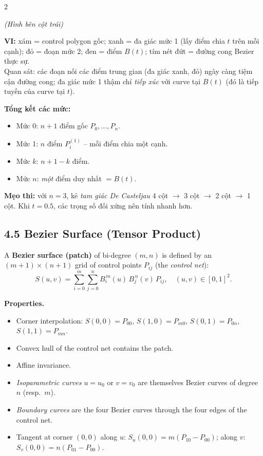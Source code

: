 \begin{paracol}{2}
\begin{center}
\textit{(Hình bên cột trái)}
\end{center}

\textbf{VI:} xám = control polygon gốc; xanh = đa giác mức 1 (lấy điểm chia $t$ trên mỗi cạnh); đỏ = đoạn mức 2; đen = điểm $B(t)$; tím nét đứt = đường cong Bezier thực sự.\\
Quan sát: các đoạn nối các điểm trung gian (đa giác xanh, đỏ) ngày càng tiệm cận đường cong; đa giác mức 1 thậm chí \emph{tiếp xúc} với curve tại $B(t)$ (đó là tiếp tuyến của curve tại $t$).

\medskip
\textbf{Tổng kết các mức:}
\begin{itemize}[leftmargin=*,nosep]
  \item Mức 0: $n{+}1$ điểm gốc $P_0,\dots,P_n$.
  \item Mức 1: $n$ điểm $P_i^{(1)}$ -- mỗi điểm chia một cạnh.
  \item Mức $k$: $n{+}1{-}k$ điểm.
  \item Mức $n$: \emph{một} điểm duy nhất $=B(t)$.
\end{itemize}
\textbf{Mẹo thi:} với $n=3$, kẻ \emph{tam giác De Casteljau} 4 cột $\to$ 3 cột $\to$ 2 cột $\to$ 1 cột. Khi $t=0.5$, các trọng số đối xứng nên tính nhanh hơn.

\switchcolumn*

\subsection*{4.5 Bezier Surface (Tensor Product)}

A \textbf{Bezier surface (patch)} of bi-degree $(m,n)$ is defined by an $(m{+}1)\times(n{+}1)$ grid of control points $P_{ij}$ (the \emph{control net}):
\[
S(u,v)=\sum_{i=0}^{m}\sum_{j=0}^{n}B_i^{\,m}(u)\,B_j^{\,n}(v)\,P_{ij},
\quad (u,v)\in[0,1]^{2}.
\]

\textbf{Properties.}
\begin{itemize}[leftmargin=*,nosep]
  \item Corner interpolation: $S(0,0)=P_{00}$, $S(1,0)=P_{m0}$, $S(0,1)=P_{0n}$, $S(1,1)=P_{mn}$.
  \item Convex hull of the control net contains the patch.
  \item Affine invariance.
  \item \emph{Isoparametric curves} $u=u_0$ or $v=v_0$ are themselves Bezier curves of degree $n$ (resp.\ $m$).
  \item \emph{Boundary curves} are the four Bezier curves through the four edges of the control net.
  \item Tangent at corner $(0,0)$ along $u$: $S_u(0,0)=m(P_{10}-P_{00})$; along $v$: $S_v(0,0)=n(P_{01}-P_{00})$.
\end{itemize}


\end{paracol}
